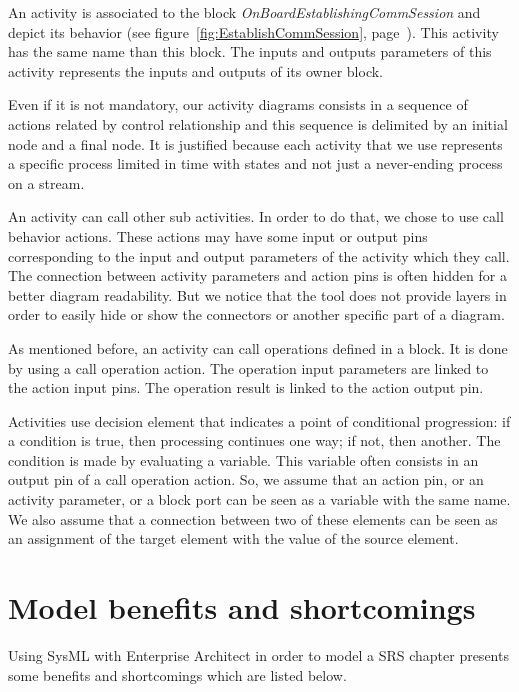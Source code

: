 \documentclass{template/openetcs_report}
\newcommand\refFigure[1]{figure~\ref{#1}, page~\pageref{#1}}
\begin{document}
An activity is associated to the block \textsl{OnBoardEstablishingCommSession} and depict its behavior (see \refFigure{fig:EstablishCommSession}). This activity has the same name than this block. The inputs and outputs parameters of this activity represents the inputs and outputs of its owner block. 

Even if it is not mandatory, our activity diagrams consists in a sequence of actions related by control relationship and this sequence is delimited by an initial node and a final node. It is justified because each activity that we use represents a specific  process limited in time with states and not just a never-ending process on a stream.

An activity can call other sub activities. In order to do that, we chose to use call behavior actions. These actions may have some input or output pins corresponding to the input and output parameters of the activity which they call. The connection between activity parameters and action pins is often hidden for a better diagram readability. But we notice that the tool does not provide layers in order to easily hide or show the connectors or another specific part of a diagram.

As mentioned before, an activity can call operations defined in a block. It is done by using a call operation action. The operation input parameters are linked to the action input pins. The operation result is linked to the action output pin.

Activities use decision element that indicates a point of conditional progression: if a condition is true, then processing continues one way; if not, then another. The condition is made by evaluating a variable. This variable often consists in an output pin of a call operation action. So, we assume that an action pin, or an activity parameter, or a block port can be seen as a variable with the same name. We also assume that a connection between two of these elements can be seen as an assignment of the target element with the value of the source element. 



\chapter{Model benefits and shortcomings}

Using SysML with Enterprise Architect in order to model a SRS chapter presents some benefits and shortcomings which are listed below.
\end{document}
